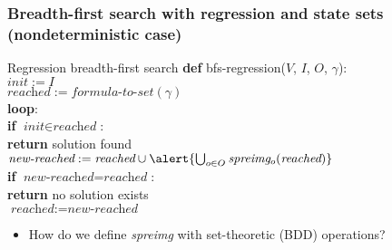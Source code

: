 \documentclass{gkibeamer}
\begin{document}
\begin{frame}[t]
  \frametitle{Breadth-first search with regression and
    state sets (nondeterministic case)}

  \begin{block}{Regression breadth-first search}
    \textbf{def} bfs-regression($V$, $I$, $O$, $\gamma$): \\
    {}\qquad$\textit{init} := I$ \\
    {}\qquad$\textit{reached} := \textit{formula-to-set}(\gamma)$ \\
    {}\qquad\textbf{loop}: \\
    {}\qquad\qquad\textbf{if} $\textit{init} \in \textit{reached}$: \\
    {}\qquad\qquad\qquad\textbf{return} solution found \\
    {}\qquad\qquad$\textit{new-reached} := \textit{reached} \cup
    \alert{\bigcup_{o \in O} \spreimage{o}{\textit{reached}}}$ \\
    {}\qquad\qquad\textbf{if} $\textit{new-reached} = 
    \textit{reached}$: \\
    {}\qquad\qquad\qquad\textbf{return} no solution exists \\
    {}\qquad\qquad$\textit{reached} := \textit{new-reached}$
  \end{block}

  \begin{itemize}
  \item How do we define \alert{\textit{spreimg}} with set-theoretic
    (BDD) operations?
  \end{itemize}
\end{frame}
\end{document}
